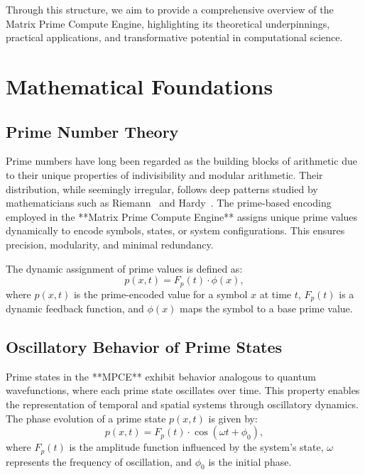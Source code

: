 \documentclass{article}
\theoremstyle{plain}
\begin{document}
\noindent Through this structure, we aim to provide a comprehensive overview of the Matrix Prime Compute Engine, highlighting its theoretical underpinnings, practical applications, and transformative potential in computational science.

\section{Mathematical Foundations}

\subsection{Prime Number Theory}

Prime numbers have long been regarded as the building blocks of arithmetic due to their unique properties of indivisibility and modular arithmetic. Their distribution, while seemingly irregular, follows deep patterns studied by mathematicians such as Riemann~\cite{riemann1859hypothesis} and Hardy~\cite{hardy2008introduction}. The prime-based encoding employed in the **Matrix Prime Compute Engine** assigns unique prime values dynamically to encode symbols, states, or system configurations. This ensures precision, modularity, and minimal redundancy.

The dynamic assignment of prime values is defined as:
\begin{equation}
    p(x, t) = F_p(t) \cdot \phi(x),
\end{equation}
where \( p(x, t) \) is the prime-encoded value for a symbol \( x \) at time \( t \), \( F_p(t) \) is a dynamic feedback function, and \( \phi(x) \) maps the symbol to a base prime value.

\subsection{Oscillatory Behavior of Prime States}

Prime states in the **MPCE** exhibit behavior analogous to quantum wavefunctions, where each prime state oscillates over time. This property enables the representation of temporal and spatial systems through oscillatory dynamics. The phase evolution of a prime state \( p(x, t) \) is given by:
\begin{equation}
    p(x, t) = F_p(t) \cdot \cos(\omega t + \phi_0),
\end{equation}
where \( F_p(t) \) is the amplitude function influenced by the system's state, \( \omega \) represents the frequency of oscillation, and \( \phi_0 \) is the initial phase.
\end{document}
